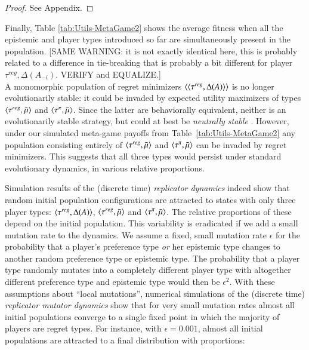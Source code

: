 \documentclass[fleqn,reqno,11pt]{article}
\begin{document}
\begin{proof}
See Appendix.
\end{proof}

Finally, Table \ref{tab:Utils-MetaGame2} shows the average fitness when all the epistemic and player types introduced so far are simultaneously present in the population. [SAME WARNING: it is not exactly identical here, this is probably related to a difference in tie-breaking that is probably a bit different for player $\tau^{reg}, \Delta(A_{-i})$. VERIFY and EQUALIZE.]\\
A monomorphic population of regret
minimizers $\left \langle \left \langle \tau^{reg}, \Delta(A)\right\rangle\right\rangle$ is no longer
evolutionarily stable: it could be invaded by expected utility maximizers of types $\left \langle \tau^{reg}, \bar{\mu}\right\rangle$ and $\left \langle \tau^{\pi},
  \bar{\mu}\right\rangle$. Since the latter are behaviorally equivalent, neither
is an evolutionarily stable strategy, but could at best be
\emph{neutrally stable}
\cite{Maynard-Smith1982:Evolution-and-t}. However, under our simulated
meta-game payoffs from Table~\ref{tab:Utils-MetaGame2} any population
consisting entirely of $\left \langle \tau^{reg}, \bar{\mu}\right\rangle$ and
$\left \langle \tau^{\pi}, \bar{\mu}\right\rangle$ can be invaded by regret
minimizers. This suggests that all three types would persist under
standard evolutionary dynamics, in various relative proportions.

Simulation results of the (discrete time) \emph{replicator dynamics}
\cite{TaylorJonker1978:Evolutionary-St} indeed show that random
initial population configurations are attracted to states with only
three player types: $\left \langle \tau^{reg}, \Delta(A)\right\rangle$,
$\left \langle \tau^{reg}, \bar{\mu}\right\rangle$ and $\left \langle \tau^{\pi},
  \bar{\mu}\right\rangle$. The relative proportions of these depend on the initial
population. This variability is eradicated if we add a small mutation
rate to the dynamics. We assume a fixed, small mutation rate
$\epsilon$ for the probability that a player's preference type
\emph{or} her epistemic type changes to another random preference type
or epistemic type. The probability that a player type randomly mutates
into a completely different player type with altogether different
preference type and epistemic type would then be $\epsilon^2$. With
these assumptions about ``local mutations'', numerical simulations of
the (discrete time) \emph{replicator mutator dynamics}
\cite{Nowak2006:Evolutionary-Dy} show that for very small
mutation rates almost all initial populations converge to a single
fixed point in which the majority of players are regret types. For
instance, with $\epsilon = 0.001$, almost all initial populations are
attracted to a final distribution with proportions:
\end{document}
